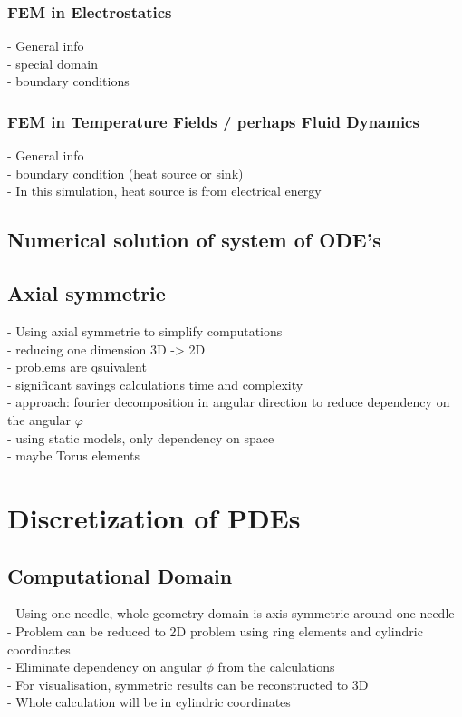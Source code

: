 \documentclass[parskip=half, titlepage=yes, 12pt, BCOR=12mm, DIV=calc]{scrartcl}
\begin{document}
\subsubsection{FEM in Electrostatics}
- General info \\
- special domain \\
- boundary conditions \\

\subsubsection{FEM in Temperature Fields / perhaps Fluid Dynamics}
- General info \\
- boundary condition (heat source or sink) \\
- In this simulation, heat source is from electrical energy \\

\subsection{Numerical solution of system of ODE's}

\subsection{Axial symmetrie}
- Using axial symmetrie to simplify computations \\
- reducing one dimension 3D -> 2D \\
- problems are qsuivalent \\
- significant savings calculations time and complexity \\
- approach: fourier decomposition in angular direction to reduce dependency on the angular $\varphi$ \\
- using static models, only dependency on space \\
- maybe Torus elements \\




\section{Discretization of PDEs}

\subsection{Computational Domain}
- Using one needle, whole geometry domain is axis symmetric around one needle \\
- Problem can be reduced to 2D problem using ring elements and cylindric coordinates \\
- Eliminate dependency on angular $\phi$ from the calculations \\
- For visualisation, symmetric results can be reconstructed to 3D \\
- Whole calculation will be in cylindric coordinates \\
\end{document}
